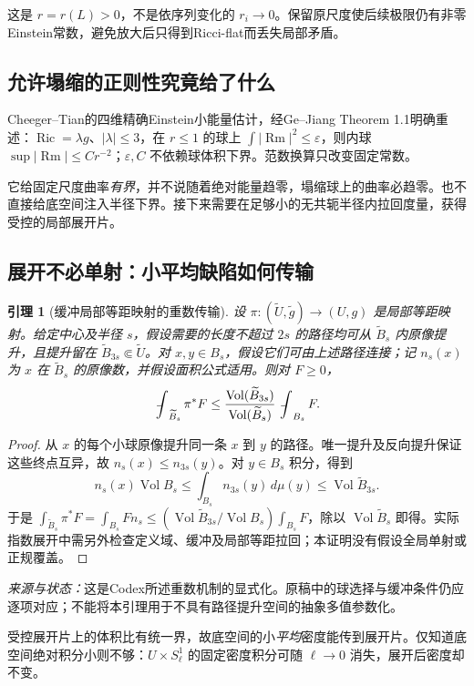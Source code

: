 \documentclass[UTF8,a4paper,11pt,fontset=fandol]{ctexart}
\numberwithin{equation}{section}
\newtheorem{lemma}[theorem]{引理}
\theoremstyle{definition}
\newcommand{\Ric}{\operatorname{Ric}}
\newcommand{\Rm}{\operatorname{Rm}}
\newcommand{\Vol}{\operatorname{Vol}}
\newcommand{\fint}{\mathop{\rlap{\,\raisebox{0.1ex}{\tiny$-$}}\int}\nolimits}
\newcommand{\source}[1]{\par\noindent\textit{来源与状态：}#1\par}
\begin{document}
这是 $r=r(L)>0$，不是依序列变化的 $r_i\to0$。保留原尺度使后续极限仍有非零Einstein常数，避免放大后只得到Ricci-flat而丢失局部矛盾。

\subsection{允许塌缩的正则性究竟给了什么}
Cheeger--Tian的四维精确Einstein小能量估计，经Ge--Jiang Theorem 1.1明确重述：$\Ric=\lambda g$、$|\lambda|\le3$，在 $r\le1$ 的球上 $\int|\Rm|^2\le\varepsilon$，则内球 $\sup|\Rm|\le Cr^{-2}$；$\varepsilon,C$ 不依赖球体积下界\cite{CT2006,GJ2017}。范数换算只改变固定常数。

它给固定尺度曲率\emph{有界}，并不说随着绝对能量趋零，塌缩球上的曲率必趋零。也不直接给底空间注入半径下界。接下来需要在足够小的无共轭半径内拉回度量，获得受控的局部展开片。

\subsection{展开不必单射：小平均缺陷如何传输}
\begin{lemma}[缓冲局部等距映射的重数传输]\label{lem:transport}
设 $\pi:(\widetilde U,\widetilde g)\to(U,g)$ 是局部等距映射。给定中心及半径 $s$，假设需要的长度不超过 $2s$ 的路径均可从 $\widetilde B_s$ 内原像提升，且提升留在 $\widetilde B_{3s}\Subset\widetilde U$。对 $x,y\in B_s$，假设它们可由上述路径连接；记 $n_s(x)$ 为 $x$ 在 $\widetilde B_s$ 的原像数，并假设面积公式适用。则对 $F\ge0$，
\begin{equation}\label{eq:transport}
\fint_{\widetilde B_s}\pi^*F\le
\frac{\Vol(\widetilde B_{3s})}{\Vol(\widetilde B_s)}\fint_{B_s}F.
\end{equation}
\end{lemma}
\begin{proof}
从 $x$ 的每个小球原像提升同一条 $x$ 到 $y$ 的路径。唯一提升及反向提升保证这些终点互异，故 $n_s(x)\le n_{3s}(y)$。对 $y\in B_s$ 积分，得到
\[
n_s(x)\Vol B_s\le\int_{B_s}n_{3s}(y)\,d\mu(y)\le\Vol\widetilde B_{3s}.
\]
于是 $\int_{\widetilde B_s}\pi^*F=\int_{B_s}F n_s\le(\Vol\widetilde B_{3s}/\Vol B_s)\int_{B_s}F$，除以 $\Vol\widetilde B_s$ 即得。实际指数展开中需另外检查定义域、缓冲及局部等距拉回；本证明没有假设全局单射或正规覆盖。
\end{proof}
\source{这是Codex所述重数机制的显式化。原稿中的球选择与缓冲条件仍应逐项对应；不能将本引理用于不具有路径提升空间的抽象多值参数化。}

受控展开片上的体积比有统一界，故底空间的小\emph{平均}密度能传到展开片。仅知道底空间绝对积分小则不够：$U\times S^1_\ell$ 的固定密度积分可随 $\ell\to0$ 消失，展开后密度却不变。
\end{document}
